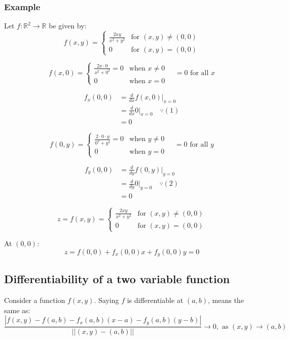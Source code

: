 \documentclass[11pt]{article}
\begin{document}
\subsubsection{Example}
\label{sec:org7f0067e}
Let \(f : \mathbb{R}^2 \rightarrow \mathbb{R}\) be given by:
\[
f(x, y) = \begin{cases}
\frac{2xy}{x^2 + y^2} & \text{for } (x, y) \ne (0, 0) \\
0 & \text{for } (x, y) = (0, 0)
\end{cases}
\]

\[
f(x, 0) = \begin{cases}
\frac{2x \cdot 0}{x^2 + 0^2} = 0 & \text{when } x \ne 0 \\
0 & \text{when } x = 0
\end{cases}
\quad = 0 \text{ for all } x \tag{1}
\]

\begin{align*}
f_x(0, 0) &= \frac{d}{dx} f(x, 0)|_{x = 0} \\
&= \frac{d}{dx} 0|_{x = 0} \quad \because (1) \\
&= 0
\end{align*}

\[
f(0, y) = \begin{cases}
\frac{2 \cdot 0 \cdot y}{0^2 + y^2} = 0 & \text{when } y \ne 0 \\
0 & \text{when } y = 0
\end{cases}
\quad = 0 \text{ for all } y \tag{2}
\]

\begin{align*}
f_y(0, 0) &= \frac{d}{dy} f(0, y)|_{y = 0} \\
&= \frac{d}{dy} 0|_{y = 0} \quad \because (2) \\
&= 0
\end{align*}

\[
z = f(x, y) = \begin{cases}
\frac{2xy}{x^2 + y^2} & \text{for } (x, y) \ne (0, 0) \\
0 & \text{for } (x, y) = (0, 0)
\end{cases}
\]

At \((0, 0)\):
\[z = f(0, 0) + f_x(0, 0)x + f_y(0, 0)y = 0\]

\subsection{Differentiability of a two variable function}
\label{sec:org929e661}
Consider a function \(f(x, y)\). Saying \(f\) is differentiable at \((a, b)\), means the same as:
\[\frac{|f(x, y) - f(a, b) - f_x(a, b) (x - a) - f_y(a, b) (y - b)|}{||(x, y) - (a, b)||} \rightarrow 0, \text{ as } (x, y) \rightarrow (a, b)\]
\end{document}
